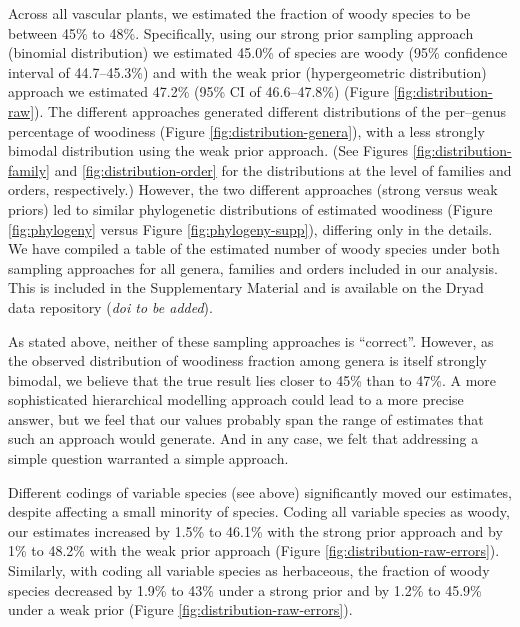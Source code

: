 \documentclass[a4paper,12pt]{article}
\begin{document}
Across all vascular plants, we estimated the fraction of woody species
to be between 45\% to 48\%.
Specifically, using our strong prior sampling approach (binomial
distribution) we estimated 45.0\% of species are woody (95\%
confidence interval of 44.7--45.3\%) and with the weak prior
(hypergeometric distribution) approach we estimated 47.2\% (95\% CI of
46.6--47.8\%) (Figure \ref{fig:distribution-raw}).
%
The different approaches generated different distributions of the
per--genus percentage of woodiness (Figure
\ref{fig:distribution-genera}), with a less strongly bimodal
distribution using the weak prior approach. (See Figures
\ref{fig:distribution-family} and \ref{fig:distribution-order} 
for the distributions at the level of families and orders, respectively.) 
However, the two different approaches (strong
versus weak priors) led to similar phylogenetic distributions of
estimated woodiness (Figure \ref{fig:phylogeny} versus Figure
\ref{fig:phylogeny-supp}), differing only in the details. We have compiled
a table of the estimated number of woody species under both sampling
approaches for all genera, families and orders included in our analysis.
This is included in the Supplementary Material and is available on the 
Dryad data repository (\textit{doi to be added}).

As stated above, neither of these sampling approaches is ``correct''. However,
as the observed distribution of woodiness fraction among genera is
itself strongly bimodal, we believe that the true result lies closer
to 45\% than to 47\%.  A more sophisticated hierarchical modelling
approach could lead to a more precise answer, but we feel that our
values probably span the range of estimates that such an approach
would generate. And in any case, we felt that addressing a simple question
warranted a %
simple approach.  

Different codings of variable species (see above) significantly moved our estimates,
despite affecting a small minority of species.  Coding all
variable species as woody, our estimates 
increased by 1.5\% to 46.1\% with the strong prior approach
and by 1\% to 48.2\% with the weak prior approach (Figure
\ref{fig:distribution-raw-errors}). Similarly, with coding
all variable species as herbaceous, the fraction of woody species
decreased by 1.9\% to 43\% under a strong prior
and by 1.2\% to 45.9\% under a weak prior (Figure
\ref{fig:distribution-raw-errors}).
\end{document}
